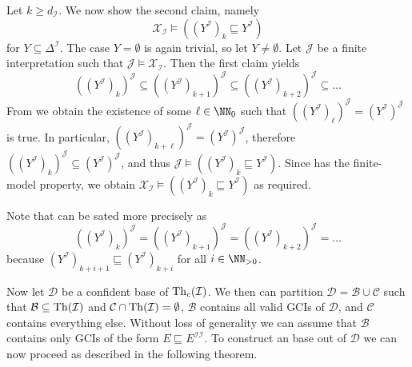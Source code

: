 \begin{Proof}
  Let $k \geq d_{\mathcal{I}}$.  We now show the second claim, namely
  \begin{equation*}
    \mathcal{X}_{\mathcal{I}} \models ((Y^{\mathcal{I}})_{k} \sqsubseteq Y^{\mathcal{I}})
  \end{equation*}
  for $Y \subseteq \Delta^{\mathcal{I}}$.  The case $Y = \emptyset$ is again trivial, so
  let $Y \neq \emptyset$.  Let $\mathcal{J}$ be a finite interpretation such that
  $\mathcal{J} \models \mathcal{X}_{\mathcal{I}}$.  Then the first claim yields
  \begin{equation}
    \label{eq:65}
    ((Y^{\mathcal{I}})_{k})^{\mathcal{J}} \subseteq
    ((Y^{\mathcal{I}})_{k+1})^{\mathcal{J}} \subseteq
    ((Y^{\mathcal{I}})_{k+2})^{\mathcal{J}} \subseteq \dots
  \end{equation}
  From  we obtain the existence of some $\ell \in \NN_0$ such
  that $((Y^{\mathcal{I}})_\ell)^{\mathcal{J}} = (Y^{\mathcal{I}})^{\mathcal{J}}$ is true.
  In particular, $((Y^{\mathcal{I}})_{k + \ell})^{\mathcal{J}} =
  (Y^{\mathcal{I}})^{\mathcal{J}}$, therefore $((Y^{\mathcal{I}})_{k})^{\mathcal{J}}
  \subseteq (Y^{\mathcal{I}})^{\mathcal{J}}$, and thus $\mathcal{J} \models
  ((Y^{\mathcal{I}})_{k} \sqsubseteq Y^{\mathcal{I}})$.  Since \ELbot has the finite-model
  property, we obtain $\mathcal{X}_{\mathcal{I}} \models ((Y^{\mathcal{I}})_{k}
  \sqsubseteq Y^{\mathcal{I}})$ as required.
\end{Proof}

Note that  can be sated more precisely as
\begin{equation*}
  ((Y^{\mathcal{I}})_{k})^{\mathcal{J}} =
  ((Y^{\mathcal{I}})_{k+1})^{\mathcal{J}} =
  ((Y^{\mathcal{I}})_{k+2})^{\mathcal{J}} = \dots
\end{equation*}
because $(Y^{\mathcal{I}})_{k+i+1} \sqsubseteq (Y^{\mathcal{I}})_{k+i}$ for all $i \in
\NN_{>0}$.

Now let $\mathcal{D}$ be a confident base of $\operatorname{Th}_c(\mathcal{I})$.  We then can partition
$\mathcal{D} = \mathcal{B} \cup \mathcal{C}$ such that $\mathcal{B} \subseteq
\operatorname{Th}(\mathcal{I})$ and $\mathcal{C} \cap \operatorname{Th}(\mathcal{I}) = \emptyset$, \ie $\mathcal{B}$
contains all valid GCIs of $\mathcal{D}$, and $\mathcal{C}$ contains everything else.
Without loss of generality we can assume that $\mathcal{B}$ contains only GCIs of the form
$E \sqsubseteq E^{\mathcal{I}\mathcal{I}}$.  To construct an \ELbot base out of
$\mathcal{D}$ we can now proceed as described in the following theorem.

